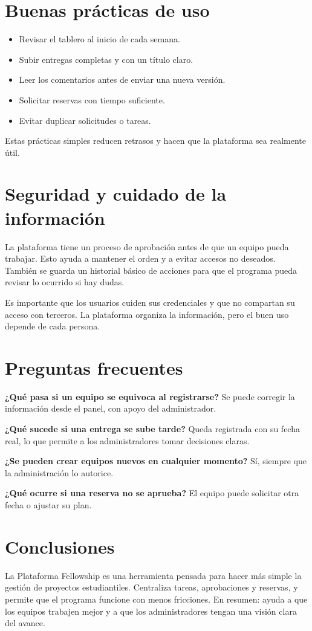 \documentclass[12pt]{article}
\begin{document}
\section{Buenas prácticas de uso}
\begin{itemize}
  \item Revisar el tablero al inicio de cada semana.
  \item Subir entregas completas y con un título claro.
  \item Leer los comentarios antes de enviar una nueva versión.
  \item Solicitar reservas con tiempo suficiente.
  \item Evitar duplicar solicitudes o tareas.
\end{itemize}

Estas prácticas simples reducen retrasos y hacen que la plataforma sea realmente útil.

\section{Seguridad y cuidado de la información}
La plataforma tiene un proceso de aprobación antes de que un equipo pueda trabajar. Esto ayuda a mantener el orden y a evitar accesos no deseados. También se guarda un historial básico de acciones para que el programa pueda revisar lo ocurrido si hay dudas.

Es importante que los usuarios cuiden sus credenciales y que no compartan su acceso con terceros. La plataforma organiza la información, pero el buen uso depende de cada persona.

\section{Preguntas frecuentes}
\textbf{¿Qué pasa si un equipo se equivoca al registrarse?} Se puede corregir la información desde el panel, con apoyo del administrador.

\textbf{¿Qué sucede si una entrega se sube tarde?} Queda registrada con su fecha real, lo que permite a los administradores tomar decisiones claras.

\textbf{¿Se pueden crear equipos nuevos en cualquier momento?} Sí, siempre que la administración lo autorice.

\textbf{¿Qué ocurre si una reserva no se aprueba?} El equipo puede solicitar otra fecha o ajustar su plan.

\section{Conclusiones}
La Plataforma Fellowship es una herramienta pensada para hacer más simple la gestión de proyectos estudiantiles. Centraliza tareas, aprobaciones y reservas, y permite que el programa funcione con menos fricciones. En resumen: ayuda a que los equipos trabajen mejor y a que los administradores tengan una visión clara del avance.
\end{document}
